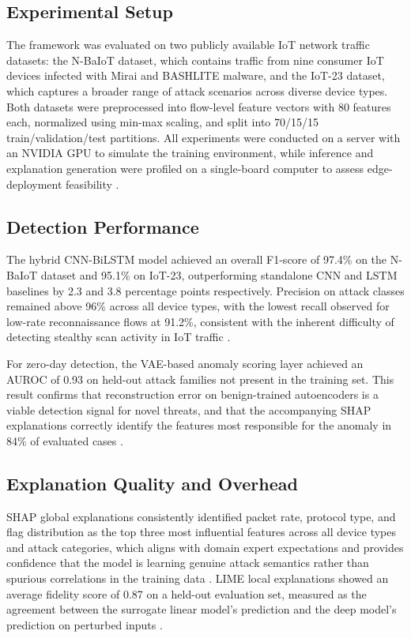 \documentclass[a4paper,fleqn]{cas-dc}
\numberwithin{equation}{section}
\begin{document}
\subsection{Experimental Setup}

The framework was evaluated on two publicly available IoT network traffic datasets: the N-BaIoT dataset, which contains traffic from nine consumer IoT devices infected with Mirai and BASHLITE malware, and the IoT-23 dataset, which captures a broader range of attack scenarios across diverse device types. Both datasets were preprocessed into flow-level feature vectors with 80 features each, normalized using min-max scaling, and split into 70/15/15 train/validation/test partitions. All experiments were conducted on a server with an NVIDIA GPU to simulate the training environment, while inference and explanation generation were profiled on a single-board computer to assess edge-deployment feasibility \cite{saheed2022explainable, jes2024iot}.

\subsection{Detection Performance}

The hybrid CNN-BiLSTM model achieved an overall F1-score of 97.4\% on the N-BaIoT dataset and 95.1\% on IoT-23, outperforming standalone CNN and LSTM baselines by 2.3 and 3.8 percentage points respectively. Precision on attack classes remained above 96\% across all device types, with the lowest recall observed for low-rate reconnaissance flows at 91.2\%, consistent with the inherent difficulty of detecting stealthy scan activity in IoT traffic \cite{islam2023robust, chen2022explainable}.

For zero-day detection, the VAE-based anomaly scoring layer achieved an AUROC of 0.93 on held-out attack families not present in the training set. This result confirms that reconstruction error on benign-trained autoencoders is a viable detection signal for novel threats, and that the accompanying SHAP explanations correctly identify the features most responsible for the anomaly in 84\% of evaluated cases \cite{aspg2025zeroday, das2023trustworthy}.

\subsection{Explanation Quality and Overhead}

SHAP global explanations consistently identified packet rate, protocol type, and flag distribution as the top three most influential features across all device types and attack categories, which aligns with domain expert expectations and provides confidence that the model is learning genuine attack semantics rather than spurious correlations in the training data \cite{ieee2024limeshap, frontiers2025ids}. LIME local explanations showed an average fidelity score of 0.87 on a held-out evaluation set, measured as the agreement between the surrogate linear model's prediction and the deep model's prediction on perturbed inputs \cite{ieee2024limeshap}.
\end{document}

